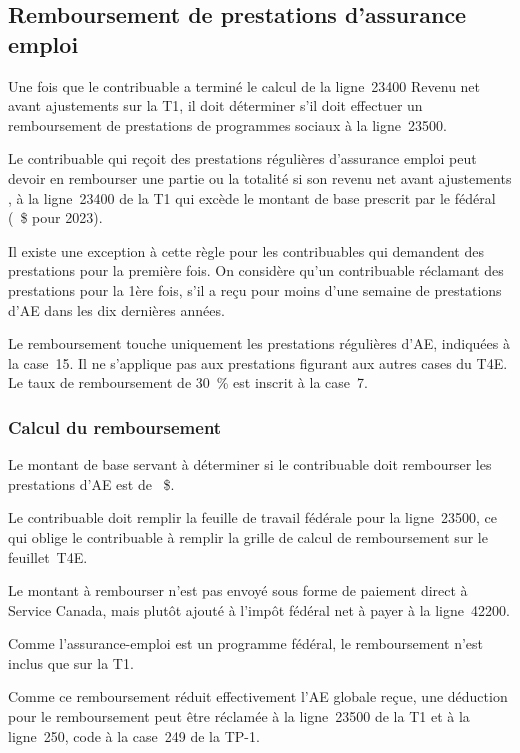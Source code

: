 \subsection{Remboursement de prestations d'assurance emploi}
Une fois que le contribuable a terminé le calcul de la ligne~23400 Revenu net avant ajustements sur la T1, il doit déterminer s'il doit effectuer un remboursement de prestations de programmes sociaux à la ligne~23500.

Le contribuable qui reçoit des prestations régulières d'assurance emploi peut devoir en rembourser une partie ou la totalité si son \og revenu net avant ajustements \fg{}, à la ligne~23400 de la T1 qui excède le montant de base prescrit par le fédéral (~\$ pour 2023). 

Il existe une exception à cette règle pour les contribuables qui demandent des prestations pour la première fois. On considère qu'un contribuable réclamant des prestations pour la 1ère fois, s'il a reçu pour moins d'une semaine de prestations d'AE dans les dix dernières années.

\begin{note}
	Le remboursement touche uniquement les prestations régulières d'AE, indiquées à la case~15. Il ne s'applique pas aux prestations figurant aux autres cases du T4E. Le taux de remboursement de 30~\% est inscrit à la case~7.
\end{note}

\subsubsection{Calcul du remboursement}
Le montant de base servant à déterminer si le contribuable doit rembourser les prestations d'AE est de ~\$.

Le contribuable doit remplir la feuille de travail fédérale pour la ligne~23500, ce qui oblige le contribuable à remplir la grille de calcul de remboursement sur le feuillet~T4E.

Le montant à rembourser n'est pas envoyé sous forme de paiement direct à Service Canada, mais plutôt ajouté à l'impôt fédéral net à payer à la ligne~42200.

Comme l'assurance-emploi est un programme fédéral, le remboursement n'est inclus que sur la T1.

Comme ce remboursement réduit effectivement l'AE globale reçue, une déduction pour le remboursement peut être réclamée à la ligne~23500 de la T1 et à la ligne~250, code  \fg{} à la case~249 de la TP-1.


